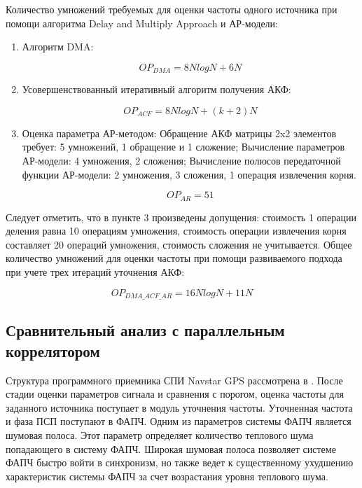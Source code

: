 Количество умножений требуемых для оценки частоты одного источника при помощи алгоритма Delay and Multiply Approach и АР-модели:
\begin{enumerate}
\item Алгоритм DMA:
	\begin{center}
	\begin{equation}
		OP_{DMA} = 8NlogN + 6N
	\end{equation}
	\end{center}
\item Усовершенствованный итеративный алгоритм получения АКФ:
	\begin{center}
	\begin{equation}
		OP_{ACF} = 8NlogN + (k+2)N
	\end{equation}
	\end{center}
\item Оценка параметра АР-методом:
	\subitem Обращение АКФ матрицы 2x2 элементов требует: 5 умножений, 1 обращение и 1 сложение;
	\subitem Вычисление параметров АР-модели: 4 умножения, 2 сложения;
	\subitem Вычисление полюсов передаточной функции АР-модели: 2 умножения, 3 сложения, 1 операция извлечения корня.

	\begin{center}
	\begin{equation}
		OP_{AR} = 51
	\end{equation}
	\end{center}
\end{enumerate}

Следует отметить, что в пункте 3 произведены допущения: стоимость 1 операции деления равна 10 операциям умножения, стоимость операции извлечения
корня составляет 20 операций умножения, стоимость сложения не учитывается.
Общее количество умножений для оценки частоты при помощи развиваемого подхода при учете трех итераций уточнения АКФ:
\begin{center}
\begin{equation}
	OP_{DMA\_ACF\_AR} = 16NlogN + 11N
\end{equation}
\end{center}

\subsection{Сравнительный анализ с параллельным коррелятором}
Структура программного приемника СПИ  Navstar GPS рассмотрена в \cite{tsui}. После стадии оценки параметров сигнала и сравнения с порогом, оценка
частоты для заданного источника поступает в модуль уточнения частоты. Уточненная частота и фаза ПСП поступают в ФАПЧ.
Одним из параметров системы ФАПЧ является шумовая полоса. Этот параметр определяет количество теплового шума попадающего в систему ФАПЧ.
Широкая шумовая полоса позволяет системе ФАПЧ быстро войти в синхронизм, но также ведет к существенному ухудшению характеристик системы ФАПЧ за счет возрастания уровня теплового шума. 

